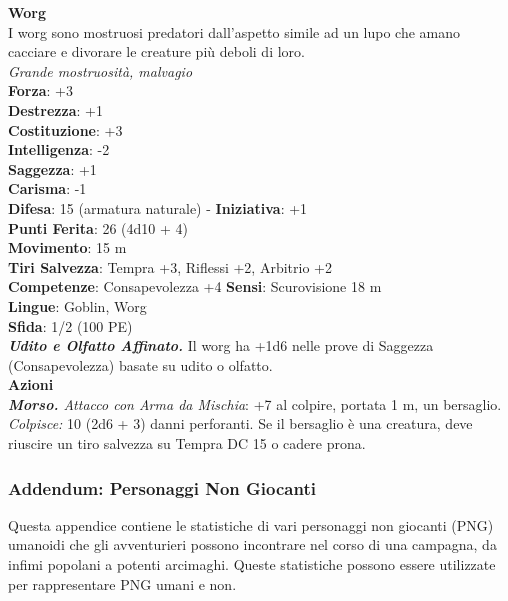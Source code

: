 \begin{multicols}{2}
\medskip\textbf{Worg}\\
I worg sono mostruosi predatori dall'aspetto simile ad un lupo che amano cacciare e divorare le creature più deboli di loro.\\
\emph{Grande mostruosità, malvagio}\\
\textbf{Forza}: +3\\
\textbf{Destrezza}: +1\\
\textbf{Costituzione}: +3\\
\textbf{Intelligenza}: -2\\
\textbf{Saggezza}: +1\\
\textbf{Carisma}: -1\\
\textbf{Difesa}: 15 (armatura naturale) - \textbf{Iniziativa}: +1\\
\textbf{Punti Ferita}: 26 (4d10 + 4)\\
\textbf{Movimento}: 15 m\\
\textbf{Tiri Salvezza}: Tempra +3, Riflessi +2, Arbitrio +2 \\
\textbf{Competenze}: Consapevolezza +4
\textbf{Sensi}: Scurovisione 18 m\\
\textbf{Lingue}: Goblin, Worg\\
\textbf{Sfida}: 1/2 (100 PE)\smallskip\\
\emph{\textbf{Udito e Olfatto Affinato.}} Il worg ha +1d6 nelle prove di Saggezza (Consapevolezza) basate su udito o olfatto.\\
\smallskip\textbf{Azioni}\\
\emph{\textbf{Morso.} Attacco con Arma da Mischia}: +7 al colpire, portata 1 m, un bersaglio.\\
\emph{Colpisce:} 10 (2d6 + 3) danni perforanti. Se il bersaglio è una creatura, deve riuscire un tiro salvezza su Tempra DC  15 o cadere prona. 

\pagebreak

\subsubsection{Addendum: Personaggi Non Giocanti}

Questa appendice contiene le statistiche di vari personaggi non giocanti (PNG) umanoidi che gli avventurieri possono incontrare nel corso di una campagna, da infimi popolani a potenti arcimaghi. Queste statistiche possono essere utilizzate per rappresentare PNG umani e non.\\


\end{multicols}

